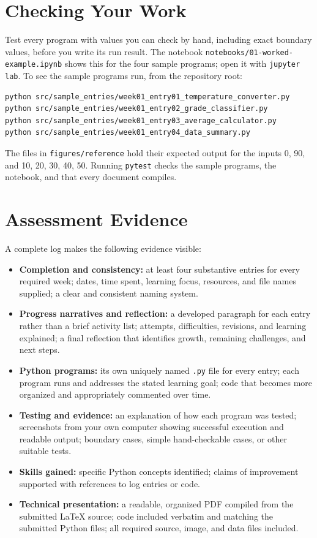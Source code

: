 \documentclass[11pt]{article}
\begin{document}
\section{Checking Your Work}
Test every program with values you can check by hand, including exact boundary values, before you write its run result. The notebook \texttt{notebooks/01-worked-example.ipynb} shows this for the four sample programs; open it with \texttt{jupyter lab}. To see the sample programs run, from the repository root:
\begin{lstlisting}[style=terminal]
python src/sample_entries/week01_entry01_temperature_converter.py
python src/sample_entries/week01_entry02_grade_classifier.py
python src/sample_entries/week01_entry03_average_calculator.py
python src/sample_entries/week01_entry04_data_summary.py
\end{lstlisting}
The files in \texttt{figures/reference} hold their expected output for the inputs 0, 90, and 10, 20, 30, 40, 50. Running \texttt{pytest} checks the sample programs, the notebook, and that every document compiles.

\section{Assessment Evidence}
A complete log makes the following evidence visible:
\begin{itemize}
  \item \textbf{Completion and consistency:} at least four substantive entries for every required week; dates, time spent, learning focus, resources, and file names supplied; a clear and consistent naming system.
  \item \textbf{Progress narratives and reflection:} a developed paragraph for each entry rather than a brief activity list; attempts, difficulties, revisions, and learning explained; a final reflection that identifies growth, remaining challenges, and next steps.
  \item \textbf{Python programs:} its own uniquely named \texttt{.py} file for every entry; each program runs and addresses the stated learning goal; code that becomes more organized and appropriately commented over time.
  \item \textbf{Testing and evidence:} an explanation of how each program was tested; screenshots from your own computer showing successful execution and readable output; boundary cases, simple hand-checkable cases, or other suitable tests.
  \item \textbf{Skills gained:} specific Python concepts identified; claims of improvement supported with references to log entries or code.
  \item \textbf{Technical presentation:} a readable, organized PDF compiled from the submitted \LaTeX{} source; code included verbatim and matching the submitted Python files; all required source, image, and data files included.
\end{itemize}
\end{document}
